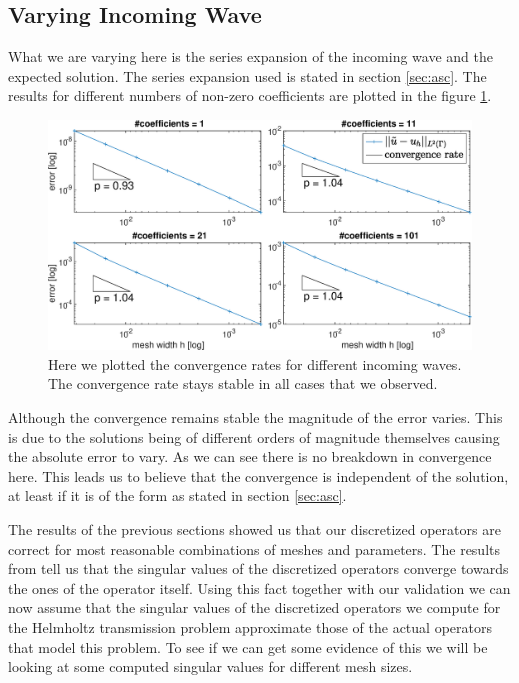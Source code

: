 \documentclass[a4paper, oneside]{thirdparty_stylesheets/discothesis}
\begin{document}
\subsection{Varying Incoming Wave}
What we are varying here is the series expansion of the incoming wave and the expected solution.
The series expansion used is stated in section \ref{sec:asc}.
The results for different numbers of non-zero coefficients are plotted in the figure \ref{fig:solutions}.
\begin{figure} [!ht]
	\centering
	\includegraphics[width=\columnwidth]{figures/solutions.eps}
	\caption{ Here we plotted the convergence rates for different incoming waves.
	The convergence rate stays stable in all cases that we observed.}
	\label{fig:solutions}
\end{figure}
Although the convergence remains stable the magnitude of the error varies.
This is due to the solutions being of different orders of magnitude themselves causing the absolute error to vary.
As we can see there is no breakdown in convergence here.
This leads us to believe that the convergence is independent of the solution, at least if it is of the form as stated in section \ref{sec:asc}.

The results of the previous sections showed us that our discretized operators are correct for most reasonable combinations of meshes and parameters.
The results from \cite{svdap} tell us that the singular values of the discretized operators converge towards the ones of the operator itself.
Using this fact together with our validation we can now assume that the singular values of the discretized operators we compute for the Helmholtz transmission problem approximate those of the actual operators that model this problem.
To see if we can get some evidence of this we will be looking at some computed singular values for different mesh sizes.
\end{document}
